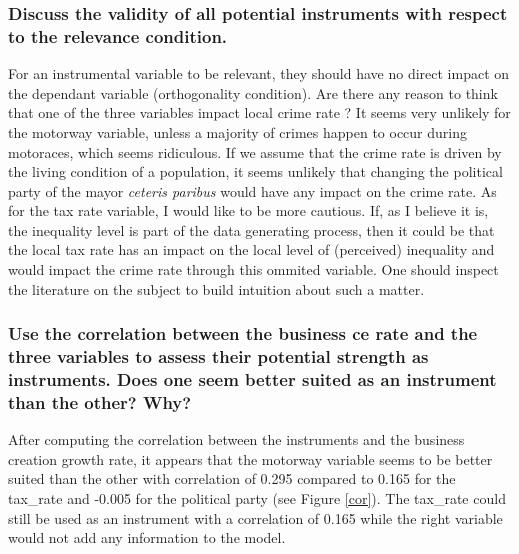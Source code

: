 \subsubsection{Discuss the validity of all potential instruments with respect to the relevance condition.}
For an instrumental variable to be relevant, they should have no direct impact on the dependant variable (orthogonality condition). Are there any reason to think that one of the three variables impact local crime rate ? It seems very unlikely for the motorway variable, unless a majority of crimes happen to occur during motoraces, which seems ridiculous. If we assume that the crime rate is driven by the living condition of a population, it seems unlikely that changing the political party of the mayor \textit{ceteris paribus} would have any impact on the crime rate. As for the tax rate variable, I would like to be more cautious. If, as I believe it is, the inequality level is part of the data generating process, then it could be that the local tax rate has an impact on the local level of (perceived) inequality and would impact the crime rate through this ommited variable. One should inspect the literature on the subject to build intuition about such a matter.
\subsubsection{Use the correlation between the business ce rate and the three variables to assess their potential strength as instruments. Does one seem better suited as an instrument than the other? Why?}

After computing the correlation between the instruments and the business creation growth rate, it appears that the motorway variable seems to be better suited than the other with correlation of 0.295 compared to 0.165 for the tax\_rate and -0.005 for the political party (see Figure \ref{cor}). The tax\_rate could still be used as an instrument with a correlation of 0.165 while the right variable would not add any information to the model.

